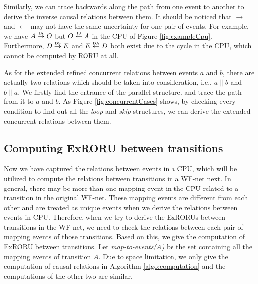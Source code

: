 \documentclass{llncs}
\begin{document}
Similarly, we can trace backwards along the path from one event to another to derive the inverse causal relations between them. It should be noticed that $\rightarrow$ and $\leftarrow$ may not have the same uncertainty for one pair of events. For example, we have $A\overset{\text{\tiny{IA}}}{\rightarrow}O$ but $O\overset{\text{\tiny{IS}}}{\leftarrow}A$ in the CPU of Figure \ref{fig:exampleCpu}. Furthermore, $D\overset{\text{\tiny{DS}}}{\rightarrow}E$ and $E\overset{\text{\tiny{DA}}}{\leftarrow}D$ both exist due to the cycle in the CPU, which cannot be computed by RORU \cite{jin2014computing} at all.

As for the extended refined concurrent relations between events $a$ and $b$, there are actually two relations which should be taken into consideration, i.e., $a\parallel b$ and $b\parallel a$. We firstly find the entrance of the parallel structure, and trace the path from it to $a$ and $b$. As Figure \ref{fig:concurrentCases} shows, by checking every condition to find out all the \textit{loop} and \textit{skip} structures, we can derive the extended concurrent relations between them.

\subsection{Computing ExRORU between transitions}
Now we have captured the relations between events in a CPU, which will be utilized to compute the relations between transitions in a WF-net next. In general, there may be more than one mapping event in the CPU related to a transition in the original WF-net. These mapping events are different from each other and are treated as unique events when we derive the relations between events in CPU. Therefore, when we try to derive the ExRORUs between transitions in the WF-net, we need to check the relations between each pair of mapping events of those transitions. Based on this, we give the computation of ExRORU between transitions. Let \textit{map-to-events(A)} be the set containing all the mapping events of transition $A$. Due to space limitation, we only give the computation of causal relations in Algorithm \ref{algo:computation} and the computations of the other two are similar. %
\end{document}
